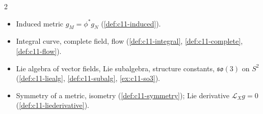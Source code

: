 \begin{paracol}{2}
\begin{keyconcepts}
\begin{itemize}
  \item Induced metric $g_M=\phi^*g_N$ (\cref{def:c11-induced}).
  \item Integral curve, complete field, flow (\cref{def:c11-integral}, \cref{def:c11-complete}, \cref{def:c11-flow}).
  \item Lie algebra of vector fields, Lie subalgebra, structure constants, $\mathfrak{so}(3)$ on $S^2$ (\cref{def:c11-liealg}, \cref{def:c11-subalg}, \cref{ex:c11-so3}).
  \item Symmetry of a metric, isometry (\cref{def:c11-symmetry}); Lie derivative $\mathcal L_Xg=0$ (\cref{def:c11-liederivative}).
\end{itemize}
\end{keyconcepts}

\flushside
\end{paracol}
